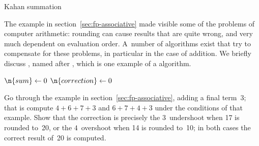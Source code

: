 


 {Kahan summation}
\label{sec:arith-kahan}

The example in section~\ref{sec:fp-associative} made visible some of
the problems of computer arithmetic: rounding can cause results that
are quite wrong, and very much dependent on evaluation order. A~number
of algorithms exist that try to compensate for these problems, in
particular in the case of addition. We briefly discuss
\cite{Kahan:1965:summation}, named after
, which is one example of a
 algorithm.

\begin{displayalgorithm}
  $\n{sum}\leftarrow0$\;
  $\n{correction}\leftarrow0$\;
\end{displayalgorithm}

\begin{exercise}
  \label{ex:kahan-sum}
  Go through the example in section~\ref{sec:fp-associative}, adding a
  final term~3; that is compute $4+6+7+3$ and $6+7+4+3$ under the
  conditions of that example.
  Show that the correction is precisely the $3$~undershoot when 17 is rounded
  to~20, or the $4$~overshoot when 14 is rounded to~10; in both cases
  the correct result of~20 is computed.
\end{exercise}

